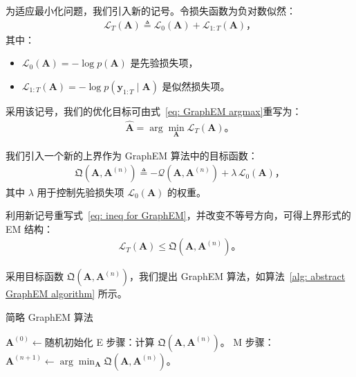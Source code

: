为适应最小化问题，我们引入新的记号。令损失函数为负对数似然：
\begin{align*}
    \mathcal{L}_T(\mathbf{A}) \triangleq \mathcal{L}_0(\mathbf{A}) + \mathcal{L}_{1:T}(\mathbf{A})，
\end{align*}
其中：
\begin{itemize}
    \item \(\mathcal{L}_0(\mathbf{A}) = -\log p(\mathbf{A})\) 是先验损失项，
    \item \(\mathcal{L}_{1:T}(\mathbf{A}) = -\log p(\mathbf{y}_{1:T} \mid \mathbf{A})\) 是似然损失项。
\end{itemize}

采用该记号，我们的优化目标可由式~\eqref{eq: GraphEM argmax}重写为：
\begin{align*}
    \widehat{\mathbf{A}} = \arg \min_{\mathbf{A}} \mathcal{L}_T(\mathbf{A})。
\end{align*}

我们引入一个新的上界作为 GraphEM 算法中的目标函数：
\begin{align}
    \mathfrak{Q}(\mathbf{A}, \mathbf{A}^{(n)}) \triangleq -\mathcal{Q}(\mathbf{A}, \mathbf{A}^{(n)}) + \lambda \, \mathcal{L}_0(\mathbf{A})， \label{eq: new upper bound for GraphEM}
\end{align}
其中 \(\lambda\) 用于控制先验损失项 \(\mathcal{L}_0(\mathbf{A})\) 的权重。

利用新记号重写式~\eqref{eq: ineq for GraphEM}，并改变不等号方向，可得上界形式的 EM 结构：
\begin{align*}
    \mathcal{L}_T(\mathbf{A}) \le \mathfrak{Q}(\mathbf{A}, \mathbf{A}^{(n)})。
\end{align*}

采用目标函数 \(\mathfrak{Q}(\mathbf{A}, \mathbf{A}^{(n)})\)，我们提出 GraphEM 算法，如算法~\ref{alg: abstract GraphEM algorithm} 所示。

\begin{algorithm}[tb]
    \caption{简略 GraphEM 算法}
    \label{alg: abstract GraphEM algorithm}
    \begin{algorithmic}[1]
        \STATE \(\mathbf{A}^{(0)} \gets \text{随机初始化}\)
            \STATE E 步骤：计算 \(\mathfrak{Q}(\mathbf{A}, \mathbf{A}^{(n)})\)。
            \STATE M 步骤：\(\mathbf{A}^{(n+1)} \gets \arg \min_{\mathbf{A}} \mathfrak{Q}(\mathbf{A}, \mathbf{A}^{(n)})\)。
        \ENDFOR
    \end{algorithmic}
\end{algorithm}


